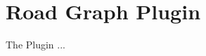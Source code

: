 
\section{Road Graph Plugin}\label{sec:roadgraph}

\updatedisclaimer

The  Plugin ...

\FloatBarrier
